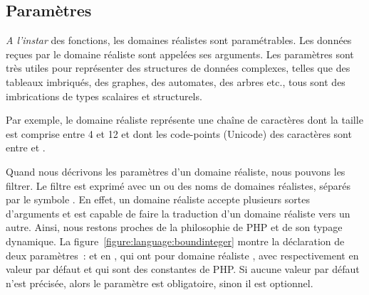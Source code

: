 \subsection{Paramètres}
\label{subsection:language:realdom:parameters}

{\em A l'instar} des fonctions, les domaines réalistes sont {\strong
paramétrables}. Les données reçues par le domaine réaliste sont appelées ses
{\strong arguments}. Les paramètres sont très utiles pour représenter des
structures de données complexes, telles que des tableaux imbriqués, des graphes,
des automates, des arbres etc., tous sont des imbrications de types scalaires et
structurels.

\begin{example}

Par exemple, le domaine réaliste 
représente une chaîne de caractères dont la taille est comprise entre 4 et 12 et
dont les code-points (Unicode) des caractères sont entre  et
.

\end{example}

Quand nous décrivons les paramètres d'un domaine réaliste, nous pouvons les
filtrer. Le filtre est exprimé avec un ou des noms de domaines réalistes,
séparés par le symbole \code{$\vert$}. En effet, un domaine réaliste accepte
plusieurs sortes d'arguments et est capable de faire la traduction d'un domaine
réaliste vers un autre. Ainsi, nous restons proches de la philosophie de PHP et
de son typage dynamique. La figure~\ref{figure:language:boundinteger} montre la
déclaration de deux paramètres~:  et  en ,
qui ont pour domaine réaliste , avec respectivement en valeur
par défaut  et  qui sont des constantes
de PHP. Si aucune valeur par défaut n'est précisée, alors le paramètre est
{\strong obligatoire}, sinon il est {\strong optionnel}.

